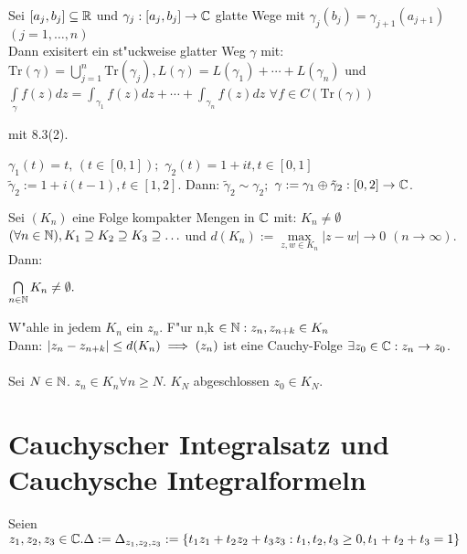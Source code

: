 \documentclass[a4paper,twoside,DIV15,BCOR12mm]{scrbook}
\def\Tr{\text{Tr}}
\def\wegint{\ensuremath{\int\limits_\gamma}}
\def\iint{\ensuremath{\int\limits}}
\begin{document}
\begin{samepage}\begin{satz}
   Sei $[a_j,b_j]\subseteq \mathbb{R}$ und $\gamma_j:[a_j,b_j]\to\mathbb{C}$ glatte Wege mit $\gamma_j(b_j)=\gamma_{j+1}(a_{j+1}) $ $ (j=1,\ldots,n)$ \\
   Dann exisitert ein st"uckweise glatter Weg $\gamma$ mit: $\Tr(\gamma) = \bigcup\limits_{j=1}^n \Tr(\gamma_j),L(\gamma)=L(\gamma_1)+\cdots+L(\gamma_n)$ und $\wegint f(z)dz = \iint_{\gamma_1} f(z)dz+\cdots+\iint_{\gamma_n} f(z)dz $ $\forall f\in C(\Tr(\gamma))$
   
\end{satz}\end{samepage}

\begin{beweis}
mit 8.3(2).
\end{beweis}
\begin{beispiel}
$\gamma_1(t)=t, \,(t\in[0,1]);$ $\gamma_2(t)=1+it, t\in[0,1]$\\
$\tilde\gamma_2:=1+i(t-1), t\in[1,2]$. Dann: $\tilde\gamma_2 \sim \gamma_2;$ $\gamma:=\gamma_1\oplus\tilde\gamma_2:[0,2]\to\mathbb{C}$.
\end{beispiel}
\begin{samepage}\begin{satz}
  Sei $(K_n)$ eine Folge kompakter Mengen in $\mathbb{C}$ mit: $K_n\neq\emptyset $ $ (\forall n\in\mathbb{N}), K_1\supseteq K_2\supseteq K_3\supseteq \ldots$ und $d(K_n):=\max\limits_{z,w\in K_n}|z-w| \to 0 $ $(n\to\infty)$. Dann: \\
  \centerline{ $\bigcap\limits_{n\in\mathbb{N}} K_n \neq \emptyset.$}
\end{satz}\end{samepage}
\begin{beweis}
W"ahle in jedem $K_n$ ein $z_n$. F"ur n,k $\in \mathbb{N}:z_n,z_{n+k}\in K_n$\\
Dann: $|z_n-z_{n+k}|\leq d(K_n) \implies (z_n)$ ist eine Cauchy-Folge \folgt $\exists z_0\in\mathbb{C}:z_n\to z_0$.\\ \\
Sei $N\in\mathbb{N}$. $z_n \in K_n \forall n\ge N$. $K_N$ abgeschlossen \folgt $z_0\in K_N$.
\end{beweis}

\chapter{Cauchyscher Integralsatz und Cauchysche Integralformeln} 
\begin{definition}
Seien $z_1,z_2,z_3 \in \mathbb{C}. \Delta := \Delta_{z_1,z_2,z_3} := \{t_1z_1+t_2z_2+t_3z_3: t_1,t_2,t_3 \geq 0, t_1+t_2+t_3 = 1 \}$
\end{definition}
\end{document}
